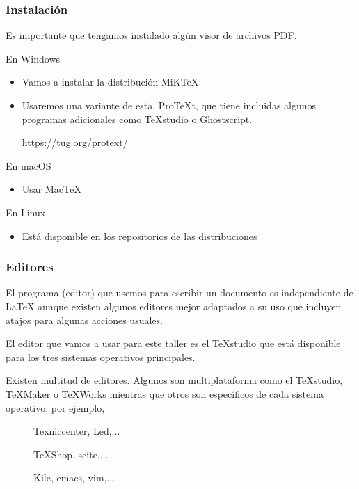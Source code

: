 \documentclass[10pt,xcolor=svgnames]{beamer}
\begin{document}
\begin{frame}
  \frametitle{Instalación}

  Es importante que tengamos instalado algún visor de archivos PDF.

  \begin{block}{En Windows \faWindows}
    \begin{itemize}
      \item Vamos a instalar la distribución MiK\TeX
      \item Usaremos una variante de esta, \alert{Pro\TeX{t}}, que tiene incluidas algunos programas adicionales como TeXstudio o Ghostscript. 

        \centerline{\small \url{https://tug.org/protext/}}

    \end{itemize}
  \end{block}


  \begin{block}{En macOS \faApple}
    \begin{itemize}
      \item Usar \alert{Mac\TeX{}}  
    \end{itemize}
  \end{block}

  \begin{block}{En Linux \faLinux}
    \begin{itemize}
      \item Está disponible en los repositorios de las distribuciones
    \end{itemize}
  \end{block}
\end{frame}


\begin{frame}
  \frametitle{Editores}

  El programa (editor) que usemos para escribir un documento es independiente de \LaTeX{} aunque existen algunos editores mejor adaptados a su uso que incluyen atajos para algunas acciones usuales.
  \medskip

  El editor que vamos a usar para este taller es el \href{https://www.texstudio.org/}{TeXstudio} que está disponible para los tres sistemas operativos principales.
  \medskip

  Existen multitud de editores. Algunos son multiplataforma como el TeXstudio, \href{https://www.xm1math.net/texmaker/}{TeXMaker} o \href{https://www.tug.org/texworks/}{TeXWorks} mientras que otros son específicos de cada sistema operativo, por ejemplo,
  \begin{description}
    \item[\faWindows] Texniccenter, Led,...
    \item[\faApple]  TeXShop,  scite,...
    \item[\faLinux] Kile, emacs, vim,...
  \end{description}
\end{frame}
\end{document}
